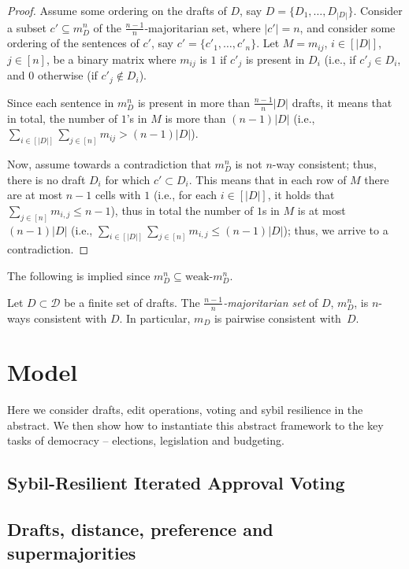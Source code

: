 \documentclass[sigconf]{aamas}  %
\newcommand{\calD}{\mathcal{D}}
\begin{document}
\begin{proof}
%
Assume some ordering on the drafts of $D$, say $D = \{D_1, \ldots, D_{|D|}\}$.
%
Consider a subset $c' \subseteq m^n_D$ of the $\frac{n-1}{n}$-majoritarian set, where $|c'| = n$, and consider some ordering of the sentences of $c'$, say $c' = \{c'_1, \ldots, c'_n\}$.
%
Let $M = m_{ij}$, $i \in [|D|]$, $j \in [n]$, be a binary matrix where $m_{ij}$ is $1$ if $c'_j$ is present in $D_i$ (i.e., if $c'_j \in D_i$, and $0$ otherwise (if $c'_j \notin D_i$).

Since each sentence in $m^n_D$ is present in more than $\frac{n-1}{n}|D|$ drafts, it means that in total, the number of $1$'s in $M$ is more than $(n-1)|D|$  (i.e., $\sum_{i \in [|D|]} \sum_{j \in [n]} m_{ij} > (n - 1)|D|$).

Now, assume towards a contradiction that $m^n_D$ is not $n$-way consistent; thus, there is no draft $D_i$ for which $c' \subset D_i$. This means that in each row of $M$ there are at most $n - 1$ cells with $1$ (i.e., for each $i \in [|D|]$, it holds that $\sum_{j \in [n]} m_{i,j} \leq n - 1$), thus in total the number of $1$s in $M$ is at most $(n - 1)|D|$ (i.e., $\sum_{i \in [|D|]}\sum_{j \in [n]} m_{i,j} \leq (n - 1)|D|$); thus, we arrive to a contradiction.
%
\end{proof}

The following is implied since $m^n_D \subseteq \textrm{weak-}m^n_D$.

\begin{corollary}
  Let $D \subset \calD$ be a finite set of drafts. The \emph{$\frac{n-1}{n}$-majoritarian set} of $D$, $m^n_D$, is $n$-ways consistent with $D$. In particular, $m_D$ is pairwise consistent with~$D$.
\end{corollary}


\section{Model}\label{section:model}

Here we consider drafts, edit operations, voting and sybil resilience in the abstract.  We then show how to instantiate this abstract framework to  the key tasks of democracy -- elections, legislation and budgeting.


\subsection{Sybil-Resilient Iterated Approval Voting}


\subsection{Drafts, distance, preference and supermajorities}
\end{document}
